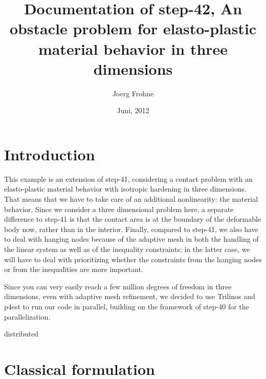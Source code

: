 \documentclass{article}
\title{Documentation of step-42, An obstacle problem for elasto-plastic material behavior in three dimensions}
\author{Joerg Frohne}
\date{Juni, 2012}
\begin{document}
\section{Introduction}

This example is an extension of step-41, considering a contact problem with an
elasto-plastic material behavior with isotropic hardening in three dimensions.
That means that we have to take care of an additional nonlinearity: the
material behavior. Since we consider a three dimensional problem here, a
separate difference to step-41 is that the contact area is at the boundary of
the deformable body now, rather than in the interior. Finally, compared to
step-41, we also have to deal with
hanging nodes because of the adaptive mesh in both the handling of the linear
system as well as of the inequality constraints; in the latter case, we will
have to deal with prioritizing whether the constraints from the hanging nodes
or from the inequalities are more important.

Since you can very easily reach a few million degrees of freedom in three
dimensions, even with adaptive mesh refinement, we decided to use Trilinos and
p4est to run our code in parallel, building on the framework of step-40 for
the parallelization.\\

\begin{huge}
{distributed}
\end{huge}


\section{Classical formulation}
\end{document}
